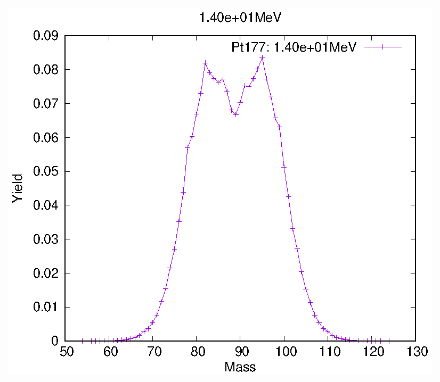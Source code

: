\begin{figure}[htbp]
\begin{minipage}{0.33\textwidth} \begin{center} \includegraphics[width=\textwidth]{YA/Pt177_1.40e+01.eps} \end{center} \end{minipage}
\end{figure}
\clearpage

